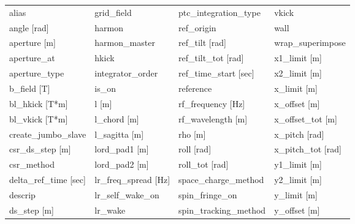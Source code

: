  \begin{tabular}{llll} \toprule
alias                            & grid_field                       & ptc_integration_type             & vkick                            \\
angle [rad]                      & harmon                           & ref_origin                       & wall                             \\
aperture [m]                     & harmon_master                    & ref_tilt [rad]                   & wrap_superimpose                 \\
aperture_at                      & hkick                            & ref_tilt_tot [rad]               & x1_limit [m]                     \\
aperture_type                    & integrator_order                 & ref_time_start [sec]             & x2_limit [m]                     \\
b_field [T]                      & is_on                            & reference                        & x_limit [m]                      \\
bl_hkick [T*m]                   & l [m]                            & rf_frequency [Hz]                & x_offset [m]                     \\
bl_vkick [T*m]                   & l_chord [m]                      & rf_wavelength [m]                & x_offset_tot [m]                 \\
create_jumbo_slave               & l_sagitta [m]                    & rho [m]                          & x_pitch [rad]                    \\
csr_ds_step [m]                  & lord_pad1 [m]                    & roll [rad]                       & x_pitch_tot [rad]                \\
csr_method                       & lord_pad2 [m]                    & roll_tot [rad]                   & y1_limit [m]                     \\
delta_ref_time [sec]             & lr_freq_spread [Hz]              & space_charge_method              & y2_limit [m]                     \\
descrip                          & lr_self_wake_on                  & spin_fringe_on                   & y_limit [m]                      \\
ds_step [m]                      & lr_wake                          & spin_tracking_method             & y_offset [m]                     \\

\end{tabular}

